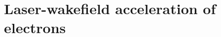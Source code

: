 \documentclass[10pt, a4paper, twoside, openright]{report}
\begin{document}

\section{Laser-wakefield acceleration of electrons}
%

%

%

%

%

%

%

%

%

\end{document}

